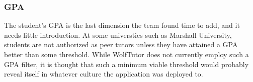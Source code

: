 \subsubsection{GPA}
The student's GPA is the last dimension the team found time to add, and it
needs little introduction.  At some universties such as Marshall University,
students are not authorized as peer tutors unless they have attained a GPA
better than some threshold.  While WolfTutor does not currently employ such a
GPA filter, it is thought that such a minimum viable threshold would probably
reveal itself in whatever culture the application was deployed to.  


